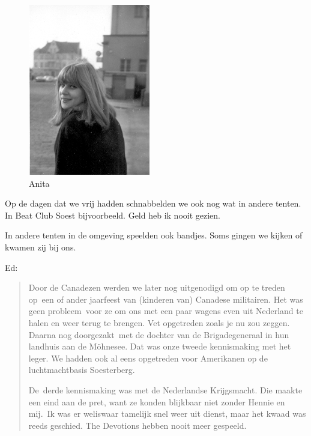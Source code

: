 \documentclass[10pt,twoside, openright]{memoir}
\begin{document}
\begin{figure}
\includegraphics[width=\textwidth]{img/ch29/Anita}
\caption*{\footnotesize Anita}
\end{figure}

Op de dagen dat we vrij hadden schnabbelden we ook nog wat in andere tenten. In Beat Club Soest bijvoorbeeld. Geld heb ik nooit gezien. 

In andere tenten in de omgeving speelden ook bandjes. Soms gingen we kijken of kwamen zij bij ons. 	

Ed:

\begin{quote}
Door de Canadezen werden we later nog uitgenodigd om op te treden op een of ander jaarfeest van (kinderen van) Canadese militairen. Het was geen probleem voor ze om ons met een paar wagens even uit Nederland te halen en weer terug te brengen. Vet opgetreden zoals je nu zou zeggen. Daarna nog doorgezakt met de dochter van de Brigadegeneraal in hun landhuis aan de Möhnesee. Dat was onze tweede kennismaking met het leger. We hadden ook al eens opgetreden voor Amerikanen op de luchtmachtbasis Soesterberg. 

De derde kennismaking was met de Nederlandse Krijgsmacht. Die maakte een eind aan de pret, want ze konden blijkbaar niet zonder Hennie en mij. Ik was er weliswaar tamelijk snel weer uit dienst, maar het kwaad was reeds geschied. The Devotions hebben nooit meer gespeeld.
\end{quote}
\end{document}
